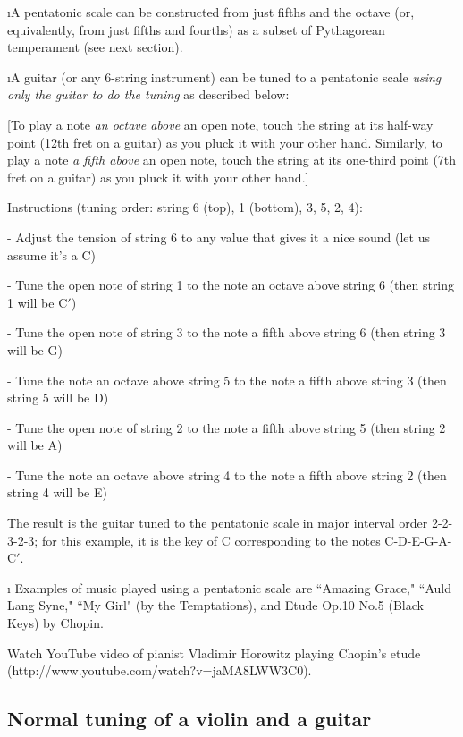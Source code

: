 \i A pentatonic scale can be constructed from 
just fifths and the octave 
(or, equivalently, from just fifths and fourths)
as a subset of Pythagorean temperament (see
next section).

\i A guitar (or any 6-string instrument) can be tuned 
to a pentatonic scale {\em using only the guitar to do
the tuning} as described below:

[To play a note {\em an octave above} an open note, touch the 
string at its half-way point (12th fret on a guitar) 
as you pluck it with your other hand.
Similarly, to play a note {\em a fifth above} an open note, 
touch the string at its one-third point (7th fret on a guitar)
as you pluck it with your other hand.]

Instructions (tuning order: string 6 (top), 1 (bottom), 3, 5, 2, 4):

- Adjust the tension of string 6 
to any value that gives it a nice sound (let us assume it's a C)

- Tune the open note of string 1 
to the note an octave above string 6 (then string 1 will be C$'$)

- Tune the open note of string 3 to the note 
a fifth above string 6 (then string 3 will be G)

- Tune the note an octave above string 5 to the note
a fifth above string 3 (then string 5 will be D)

- Tune the open note of string 2 to the note 
a fifth above string 5 (then string 2 will be A)

- Tune the note an octave above string 4 to the note
a fifth above string 2 (then string 4 will be E)

The result is the guitar tuned to the pentatonic
scale in major interval order 2-2-3-2-3;
for this example, it is the key of C corresponding to 
the notes C-D-E-G-A-C$'$.

\i \demo
Examples of music played using a pentatonic scale are
``Amazing Grace," 
``Auld Lang Syne," 
``My Girl" (by the Temptations), and
Etude Op.10 No.5 (Black Keys) by Chopin.

Watch YouTube video of pianist Vladimir Horowitz playing 
Chopin's etude \\
(http://www.youtube.com/watch?v=jaMA8LWW3C0).

\subsection{Normal tuning of a violin and a guitar}

